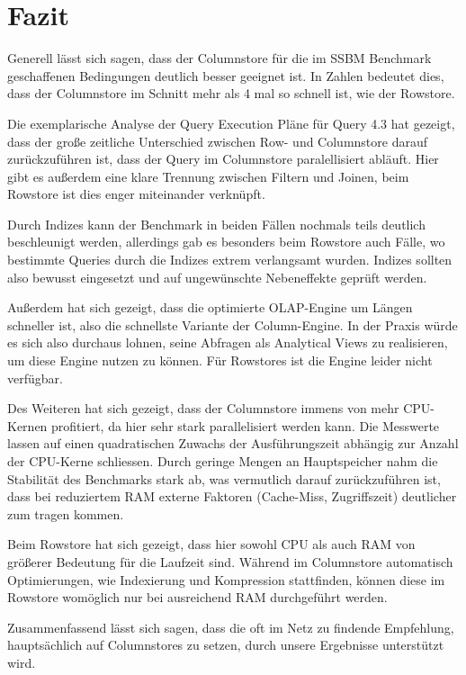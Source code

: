\chapter{Fazit}\label{chapter:fazit}
Generell lässt sich sagen, dass der Columnstore für die im SSBM Benchmark geschaffenen Bedingungen deutlich besser geeignet ist.
 In Zahlen bedeutet dies, dass der Columnstore im Schnitt mehr als 4 mal so schnell ist, wie der Rowstore.

Die exemplarische Analyse der Query Execution Pläne für Query 4.3 hat gezeigt, dass der große zeitliche Unterschied zwischen Row- und 
Columnstore darauf zurückzuführen ist, dass der Query im Columnstore paralellisiert abläuft.
Hier gibt es außerdem eine klare Trennung zwischen Filtern und Joinen, beim Rowstore ist dies enger miteinander verknüpft. 


Durch Indizes kann der Benchmark in beiden Fällen nochmals teils deutlich beschleunigt werden, allerdings gab es besonders beim Rowstore auch Fälle, 
wo bestimmte Queries durch die Indizes extrem verlangsamt wurden. Indizes sollten also bewusst eingesetzt und auf ungewünschte Nebeneffekte geprüft werden.

Außerdem hat sich gezeigt, dass die optimierte OLAP-Engine um Längen schneller ist, also die schnellste Variante der Column-Engine. In der Praxis
würde es sich also durchaus lohnen, seine Abfragen als Analytical Views zu realisieren, um diese Engine nutzen zu können. Für Rowstores ist die Engine leider nicht verfügbar.

Des Weiteren hat sich gezeigt, dass der Columnstore immens von mehr CPU-Kernen profitiert, da hier sehr stark parallelisiert werden kann. 
Die Messwerte lassen auf einen quadratischen Zuwachs der Ausführungszeit abhängig zur Anzahl der CPU-Kerne schliessen. Durch geringe Mengen an 
Hauptspeicher nahm die Stabilität des Benchmarks stark ab, was vermutlich darauf zurückzuführen ist, dass bei reduziertem RAM externe Faktoren (Cache-Miss, Zugriffszeit) deutlicher zum tragen kommen. 

Beim Rowstore hat sich gezeigt, dass hier sowohl CPU als auch RAM von größerer Bedeutung für die Laufzeit sind. 
Während im Columnstore automatisch Optimierungen, wie Indexierung und Kompression stattfinden, können diese im Rowstore womöglich nur bei ausreichend RAM durchgeführt werden. 

Zusammenfassend lässt sich sagen, dass die oft im Netz zu findende Empfehlung, hauptsächlich auf Columnstores zu setzen, durch unsere Ergebnisse unterstützt wird.
